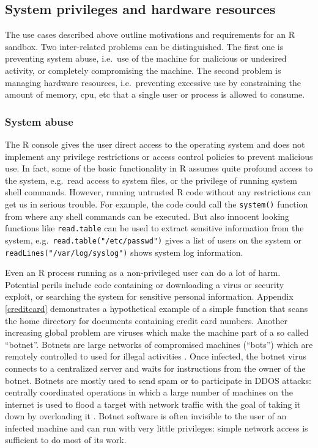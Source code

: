 \documentclass{jss}
\newcommand{\R}{\textsf{R}\xspace}
\begin{document}
\subsection{System privileges and hardware resources}

The use cases described above outline motivations and requirements for an
\R sandbox. Two inter-related problems can be distinguished. The first
one is preventing system abuse, i.e.\ use of the machine for malicious or
undesired activity, or completely compromising the machine. The second
problem is managing hardware resources, i.e.\ preventing excessive
use by constraining the amount of memory, cpu, etc that a single user
or process is allowed to consume.

\subsubsection{System abuse}

The \R console gives the user direct access to the operating system
and does not implement any privilege restrictions or access control policies to
prevent malicious use. In fact, some of the basic functionality in \R
assumes quite profound access to the system, e.g.\ read access to system files,
or the privilege of running system shell commands. However, running untrusted
\R code without any restrictions can get us in serious
trouble. For example, the code could call the \texttt{system()} function from
where any shell commands can be
executed. But also innocent looking functions
like \texttt{read.table} can be used to extract sensitive information from the
system, e.g.\ \texttt{read.table("/etc/passwd")} gives a list of users
on the system or \texttt{readLines("/var/log/syslog")} shows system log
information.

Even an \R process running as a non-privileged user can do a lot of
harm. Potential perils include code containing or downloading a virus or
security exploit, or searching the system for sensitive personal information.
Appendix \ref{creditcard} demonstrates a hypothetical example of a simple function that
scans the home directory for documents containing credit card numbers. Another
increasing global problem are viruses which make the machine part of a so called
``botnet''. Botnets are large networks of compromised machines (``bots'') which
are remotely controlled to used for illegal activities
\citep{abu2006multifaceted}. Once infected, the botnet virus connects to a
centralized server and waits for instructions from the owner of the botnet.
Botnets are mostly used to send spam or to participate in DDOS attacks:
centrally coordinated operations in which a large number of machines on the
internet is used to flood a target with network traffic with
the goal of taking it down by overloading it \citep{mirkovic2004taxonomy}. Botnet
software is often invisible to the user of an infected machine and can run with
very little privileges: simple network access is sufficient to do most of its work.
\end{document}
